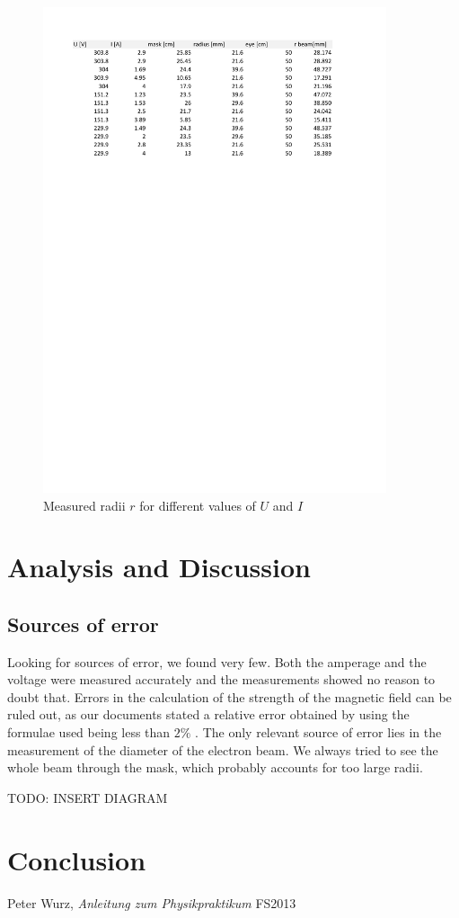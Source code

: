 \documentclass{scrreprt}
\begin{document}
\begin{figure}[H]
	\centering
  \includegraphics[width=0.9\textwidth]{diag/measurements.pdf}
	\caption{Measured radii $r$ for different values of $U$ and $I$}
	\label{fig:measurements}
\end{figure}

\section{Analysis and Discussion}

\subsection{Sources of error}
\label{sec:error}
Looking for sources of error, we found very few. Both the amperage and the voltage were measured accurately and the measurements showed no reason to doubt that. Errors in the calculation of the strength of the magnetic field can be ruled out, as our documents stated a relative error obtained by using the formulae used being less than $2\%$ \cite[p. 174]{physcript13}. 
The only relevant source of error lies in the measurement of the diameter of the electron beam. We always tried to see the whole beam through the mask, which probably accounts for too large radii. 

TODO: INSERT DIAGRAM

\section{Conclusion}

\begin{thebibliography}{9}

  Peter Wurz,
  \emph{Anleitung zum Physikpraktikum}
  FS2013

\end{thebibliography}
\end{document}
